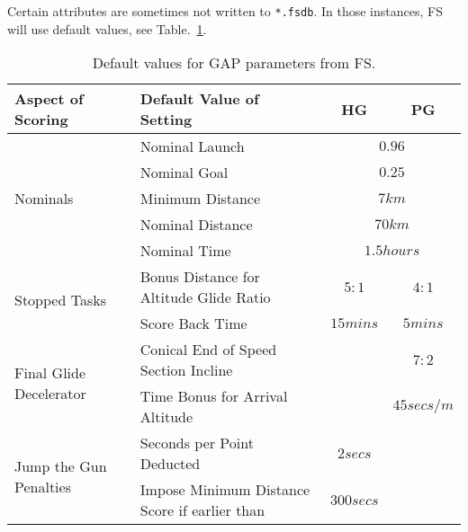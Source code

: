 \documentclass[gap.tex]{subfiles}
\begin{document}
Certain attributes are sometimes not written to \texttt{*.fsdb}. In those
instances, FS will use default values, see Table.~\ref{tab:gap-defaults}.

\begin{table}[!ht]
    \begin{tabularx}{\textwidth}{|l|X|c|c|}
    \hline
        Aspect of Scoring
        & Default Value of Setting
        & HG
        & PG
        \\
    \hline
        \multirow{5}{*}{Nominals}
        & Nominal Launch
        & \multicolumn{2}{c|}{$0.96$}
        \\
    \cline{2-4}
        & Nominal Goal
        & \multicolumn{2}{c|}{$0.25$}
        \\
    \cline{2-4}
        & Minimum Distance
        & \multicolumn{2}{c|}{$7 km$}
        \\
    \cline{2-4}
        & Nominal Distance
        & \multicolumn{2}{c|}{$70 km$}
        \\
    \cline{2-4}
        & Nominal Time
        & \multicolumn{2}{c|}{$1.5 hours$}
        \\
    \hline
        \multirow{2}{*}{Stopped Tasks}
        & Bonus Distance for Altitude Glide Ratio
        & $5:1$
        & $4:1$
        \\
    \cline{2-4}
        & Score Back Time
        & $15 mins$
        & $5 mins$
        \\
    \hline
        \multirow{2}{*}{Final Glide Decelerator}
        & Conical End of Speed Section Incline
        &
        & $7:2$
        \\
    \cline{2-4}
        & Time Bonus for Arrival Altitude
        &
        & $45 secs / m$
        \\
    \hline
        \multirow{2}{*}{Jump the Gun Penalties}
        & Seconds per Point Deducted
        & $2 secs$
        &
        \\
    \cline{2-4}
        & Impose Minimum Distance Score if earlier than
        & $300 secs$
        &
        \\
    \hline
    \end{tabularx}
    \caption{Default values for GAP parameters from FS.}
    \label{tab:gap-defaults}
\end{table}
\end{document}
